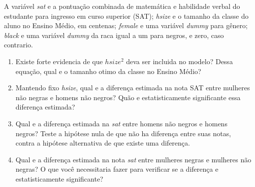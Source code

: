 \documentclass[12pt,letterpaper, onecolumn]{exam}
\begin{document}
\begin{questions}
A variável \textit{sat} e a pontuação combinada de matemática e habilidade verbal do estudante para ingresso em curso superior (SAT); \textit{hsize} e o tamanho da classe do aluno no Ensino Médio, em centenas; \textit{female} e uma variável \textit{dummy} para gênero; \textit{black} e uma variável \textit{dummy} da raca igual a um para negros, e zero, caso contrario.
\begin{enumerate}[label=(\roman*)]
    \item Existe forte evidencia de que \(hsize^2\) deva ser incluida no modelo? Dessa equação, qual e o tamanho otimo da classe no Ensino Médio?
    \item Mantendo fixo \textit{hsize}, qual e a diferença estimada na nota SAT entre mulheres não negras e homens não negros? Quão e estatisticamente significante essa diferença estimada?
    \item Qual e a diferença estimada na \textit{sat} entre homens não negros e homens negros? Teste a hipótese nula de que não ha diferença entre suas notas, contra a hipótese alternativa de que existe uma diferença.
    \item Qual e a diferença estimada na nota \textit{sat} entre mulheres negras e mulheres não negras? O que você necessitaria fazer para verificar se a diferença e estatisticamente significante?
\end{enumerate}

\vspace{0.7cm}


\end{questions}
\end{document}
